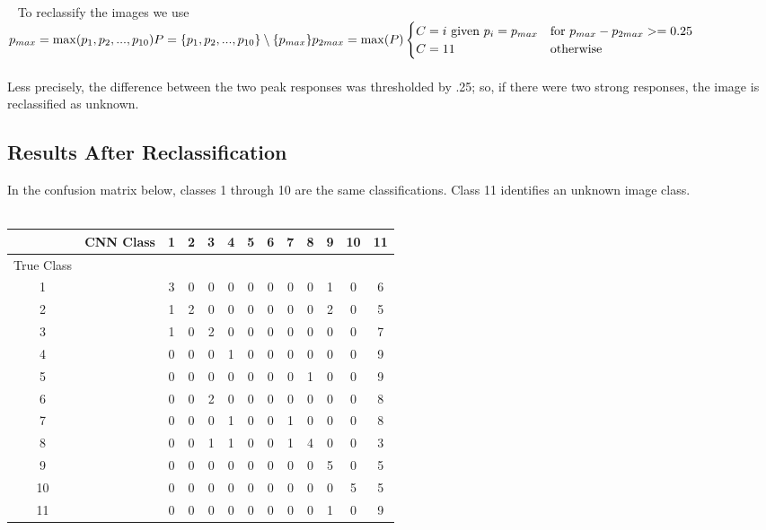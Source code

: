 \documentclass[11pt,english]{article}
\begin{document}
~\newline\noindent
To reclassify the images we use\\
\noindent
\begin{math}
p_{max} = \max(p_1,p_2,...,p_{10}) \\
P = \{p_1,p_2,...,p_{10}\} \setminus \{p_{max}\} \\
p_{2max} = \max(P) \\~\\
\begin{cases}
C = i $ given $ p_i = p_{max} & $for	$ p_{max} - p_{2max} >= 0.25 \\
C = 11 & $otherwise$
\end{cases}
\end{math}
~\\~\\
Less precisely, the difference between the two peak responses was thresholded by .25; so, if there were two strong responses, the image is reclassified as unknown.

\subsection{Results After Reclassification}
In the confusion matrix below, classes 1 through 10 are the same classifications.  Class 11 identifies an unknown image class. \\\\
\begin{tabular}{ | c | c | c | c | c | c | c | c | c | c | c | c | c | }
\hline
	 & CNN
Class & 1 & 2 & 3 & 4 & 5 & 6 & 7 & 8 & 9 & 10 & 11 \\ \hline
	True 
Class &  &  &  &  &  &  &  &  &  &  &  &  \\ \hline
	1 &  & 3 & 0 & 0 & 0 & 0 & 0 & 0 & 0 & 1 & 0 & 6 \\ \hline
	2 &  & 1 & 2 & 0 & 0 & 0 & 0 & 0 & 0 & 2 & 0 & 5 \\ \hline
	3 &  & 1 & 0 & 2 & 0 & 0 & 0 & 0 & 0 & 0 & 0 & 7 \\ \hline
	4 &  & 0 & 0 & 0 & 1 & 0 & 0 & 0 & 0 & 0 & 0 & 9 \\ \hline
	5 &  & 0 & 0 & 0 & 0 & 0 & 0 & 0 & 1 & 0 & 0 & 9 \\ \hline
	6 &  & 0 & 0 & 2 & 0 & 0 & 0 & 0 & 0 & 0 & 0 & 8 \\ \hline
	7 &  & 0 & 0 & 0 & 1 & 0 & 0 & 1 & 0 & 0 & 0 & 8 \\ \hline
	8 &  & 0 & 0 & 1 & 1 & 0 & 0 & 1 & 4 & 0 & 0 & 3 \\ \hline
	9 &  & 0 & 0 & 0 & 0 & 0 & 0 & 0 & 0 & 5 & 0 & 5 \\ \hline
	10 &  & 0 & 0 & 0 & 0 & 0 & 0 & 0 & 0 & 0 & 5 & 5 \\ \hline
	11 &  & 0 & 0 & 0 & 0 & 0 & 0 & 0 & 0 & 1 & 0 & 9 \\ \hline
\end{tabular}
\end{document}
